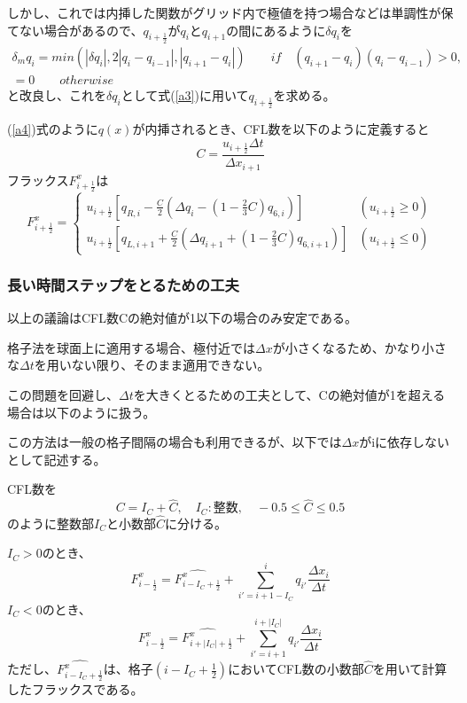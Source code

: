 \documentclass{jsbook}
\begin{document}
しかし、これでは内挿した関数がグリッド内で極値を持つ場合などは単調性が保てない場合があるので、$q_{i+\frac{1}{2}}$が$q_{i}$と$q_{i+1}$の間にあるように$\delta q_{i}$を
\begin{equation}
  \begin{split}
    \delta_{m} q_{i}=min(|\delta q_{i}|,2|q_{i}-q_{i-1}|,|q_{i+1}-q_{i}|) \qquad if\quad(q_{i+1}-q_{i})(q_{i}-q_{i-1}) >0, \\
    =0 \qquad otherwise
  \end{split}
\end{equation}
と改良し、これを$\delta q_{i}$として式(\ref{a3})に用いて$q_{i+\frac{1}{2}}$を求める。

(\ref{a4})式のように$q(x)$が内挿されるとき、CFL数を以下のように定義すると
\begin{equation}
  C=\frac{u_{i+\frac{1}{2}}\Delta t}{\Delta x_{i+1}}
\end{equation}
フラックス$F^{x}_{i+\frac{1}{2}}$は
\begin{equation}
  F^{x}_{i+\frac{1}{2}}=\begin{cases}u_{i+\frac{1}{2}}[q_{R,i}-\frac{C}{2}(\Delta q_{i}-(1-\frac{2}{3}C)q_{6,i})] & (u_{i+\frac{1}{2}}\ge0)\\
  u_{i+\frac{1}{2}}[q_{L,i+1}+\frac{C}{2}(\Delta q_{i+1}+(1-\frac{2}{3}C)q_{6,i+1})] & (u_{i+\frac{1}{2}}\leq0)
  \end{cases}
\end{equation}
\subsubsection{長い時間ステップをとるための工夫}
以上の議論はCFL数Cの絶対値が1以下の場合のみ安定である。

格子法を球面上に適用する場合、極付近では$\Delta x$が小さくなるため、かなり小さな$\Delta t$を用いない限り、そのまま適用できない。

この問題を回避し、$\Delta t$を大きくとるための工夫として、Cの絶対値が1を超える場合は以下のように扱う。

この方法は一般の格子間隔の場合も利用できるが、以下では$\Delta x$がiに依存しないとして記述する。

CFL数を
\begin{equation}
  C=I_{C}+\hat{C},\quad I_{C}:整数,\quad -0.5\le \hat{C} \le 0.5
\end{equation}
のように整数部$I_{C}$と小数部$\hat{C}$に分ける。

$I_{C}>0$のとき、
\begin{equation}
  F^{x}_{i-\frac{1}{2}}=\hat{F^{x}_{i-I_{C}+\frac{1}{2}}}+\sum^{i}_{i'=i+1-I_{C}} q_{i'} \frac{\Delta x_{i}}{\Delta t}
\end{equation}
$I_{C}<0$のとき、
\begin{equation}
  F^{x}_{i-\frac{1}{2}}=\hat{F^{x}_{i+|I_{C}|+\frac{1}{2}}}+\sum^{i+|I_{C}|}_{i'=i+1} q_{i'} \frac{\Delta x_{i}}{\Delta t}
\end{equation}
ただし、$\hat{F^{x}_{i-I_{C}+\frac{1}{2}}}$は、格子$(i-I_{C}+\frac{1}{2})$においてCFL数の小数部$\hat{C}$を用いて計算したフラックスである。
\end{document}
